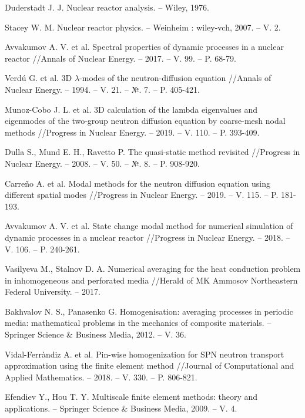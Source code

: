 \documentclass[10pt]{article}
\begin{document}
\begin{thebibliography}{8}
Duderstadt J. J. Nuclear reactor analysis. – Wiley, 1976.

Stacey W. M. Nuclear reactor physics. – Weinheim : wiley-vch, 2007. – V. 2.

Avvakumov A. V. et al. Spectral properties of dynamic processes in a nuclear reactor //Annals of Nuclear Energy. – 2017. – V. 99. – P. 68-79.

Verdú G. et al. 3D $\lambda$-modes of the neutron-diffusion equation //Annals of Nuclear Energy. – 1994. – V. 21. – №. 7. – P. 405-421.

Munoz-Cobo J. L. et al. 3D calculation of the lambda eigenvalues and eigenmodes of the two-group neutron diffusion equation by coarse-mesh nodal methods //Progress in Nuclear Energy. – 2019. – V. 110. – P. 393-409.

Dulla S., Mund E. H., Ravetto P. The quasi-static method revisited //Progress in Nuclear Energy. – 2008. – V. 50. – №. 8. – P. 908-920.

Carreño A. et al. Modal methods for the neutron diffusion equation using different spatial modes //Progress in Nuclear Energy. – 2019. – V. 115. – P. 181-193.

Avvakumov A. V. et al. State change modal method for numerical simulation of dynamic processes in a nuclear reactor //Progress in Nuclear Energy. – 2018. – V. 106. – P. 240-261.

Vasilyeva M., Stalnov D. A. Numerical averaging for the heat conduction problem in inhomogeneous and perforated media //Herald of MK Ammosov Northeastern Federal University. – 2017.

Bakhvalov N. S., Panasenko G. Homogenisation: averaging processes in periodic media: mathematical problems in the mechanics of composite materials. – Springer Science \& Business Media, 2012. – V. 36.

Vidal-Ferràndiz A. et al. Pin-wise homogenization for SPN neutron transport approximation using the finite element method //Journal of Computational and Applied Mathematics. – 2018. – V. 330. – P. 806-821.

Efendiev Y., Hou T. Y. Multiscale finite element methods: theory and applications. – Springer Science \& Business Media, 2009. – V. 4.


\end{thebibliography}
\end{document}
